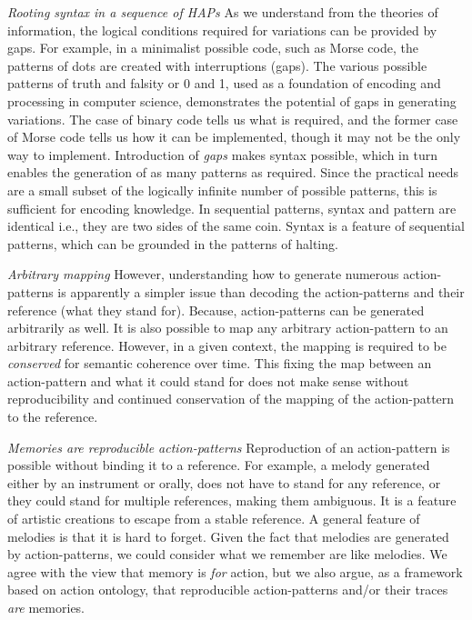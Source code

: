 \emph{Rooting syntax in a sequence of HAPs} As we understand from the theories of information, the logical conditions required for variations can be provided by gaps. For example, in a minimalist possible code, such as Morse code, the patterns of dots are created with interruptions (gaps). The various possible patterns of truth and falsity or 0 and 1, used as a foundation of encoding and processing in computer science, demonstrates the potential of gaps in generating variations. The case of binary code tells us what is required, and the former case of Morse code tells us how it can be implemented, though it may not be the only way to implement. Introduction of \textit{gaps} makes syntax possible, which in turn enables the generation of as many patterns as required. Since the practical needs are a small subset of the logically infinite number of possible patterns, this is sufficient for encoding knowledge. In sequential patterns, syntax and pattern are identical i.e., they are two sides of the same coin. Syntax is a feature of sequential patterns, which can be grounded in the patterns of halting.

\emph{Arbitrary mapping} However, understanding how to generate numerous action-patterns is apparently a simpler issue than decoding the action-patterns and their reference (what they stand for). Because, action-patterns can be generated arbitrarily as well. It is also possible to map any arbitrary action-pattern to an arbitrary reference. However, in a given context, the mapping is required to be \textit{conserved} for semantic coherence over time. This fixing the map between an action-pattern and what it could stand for does not make sense without reproducibility and continued conservation of the mapping of the action-pattern to the reference.

\emph{Memories are reproducible action-patterns} Reproduction of an action-pattern is possible without binding it to a reference. For example, a melody generated either by an instrument or orally, does not have to stand for any reference, or they could stand for multiple references, making them ambiguous. It is a feature of artistic creations to escape from a stable reference. A general feature of melodies is that it is hard to forget. Given the fact that melodies are generated by action-patterns, we could consider what we remember are like melodies. We agree with the view that memory is \textit{for} action\cite{glenberg1997memory}, but we also argue, as a framework based on action ontology, that reproducible action-patterns and/or their traces \textit{are} memories.

